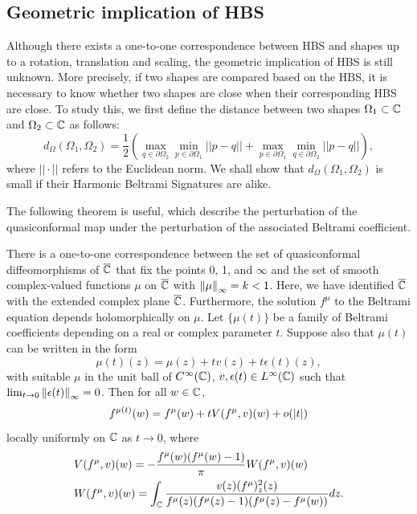 \documentclass[review,onefignum,onetabnum]{siamonline190516}
\begin{document}
\subsection{Geometric implication of HBS}\label{geometric implication}
    Although there exists a one-to-one correspondence between HBS and shapes up to a rotation, translation and scaling, the geometric implication of HBS is still unknown. More precisely, if two shapes are compared based on the HBS, it is necessary to know whether two shapes are close when their corresponding HBS are close. To study this, we first define the distance between two shapes $\Omega_1\subset \mathbb{C}$ and $\Omega_2\subset \mathbb{C}$ as follows: 
    \begin{equation}\label{shape distance}
        d_\Omega(\Omega_1,\Omega_2) = \frac{1}{2}\left(\max_{q\in\partial \Omega_2} \min_{p\in\partial \Omega_1} ||p-q|| + \max_{p\in\partial \Omega_1} \min_{q\in\partial \Omega_2} ||p-q||\right),
    \end{equation}
    \noindent where $||\cdot||$ refers to the Euclidean norm. We shall show that $d_\Omega(\Omega_1,\Omega_2)$ is small if their Harmonic Beltrami Signatures are alike.
    
The following theorem is useful, which describe the perturbation of the quasiconformal map under the perturbation of the associated Beltrami coefficient.

    \begin{theorem}\label{BHF}
        There is a one-to-one correspondence between the set of quasiconformal diffeomorphisms of $\overline{\mathbb{C}}$ that fix the points 0, 1, and $\infty$ and the set of smooth complex-valued functions $\mu$ on $\overline{\mathbb{C}}$ with $\left\Vert \mu \right\Vert_\infty = k < 1$. Here, we have identified $\overline{\mathbb{C}}$ with the extended complex plane $\overline{\mathbb{C}}$. Furthermore, the solution $f^\mu$ to the Beltrami equation depends holomorphically on $\mu$. Let $\{\mu(t)\}$ be a family of Beltrami coefficients depending on a real or complex parameter $t$. Suppose also that $\mu(t)$ can be written in the form
        \begin{equation}
            \mu(t)(z) = \mu(z) + tv(z) + t \epsilon(t)(z),
        \end{equation}
        \noindent with suitable $\mu$ in the unit ball of $C^\infty(\mathbb{C})$, $v, \epsilon(t) \in L^\infty(\mathbb{C})$ such that $\lim_{t \rightarrow 0} \left\Vert \epsilon(t) \right\Vert_\infty = 0$. Then for all $w \in \mathbb{C}$,
        \begin{equation}
            f^{\mu(t)}(w) = f^{\mu}(w) + tV(f^\mu, v)(w) + o(\left\vert t \right\vert)
        \end{equation}
        locally uniformly on $\mathbb{C}$ as $t \rightarrow 0$, where
        \begin{align}
            &V(f^\mu, v)(w) = -\frac{f^\mu(w)(f^\mu(w)-1)}{\pi}W(f^\mu, v)(w)\\
            &W(f^\mu, v)(w) = \int_{\mathbb{C}} \frac{v(z)(f^\mu)^2_z(z)}{f^\mu(z)(f^\mu(z)-1)(f^\mu(z) - f^\mu(w))}dz.
        \end{align}
    \end{theorem}
\end{document}
